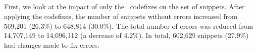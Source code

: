 \documentclass[conference]{IEEEtran}
\begin{document}



\subsection{\rqthree}
\label{sec:rq3}

First, we look at the impact of only the \ts\ codefixes on the set of snippets. After applying the codefixes, the number of snippets without errors increased from 569,201 (26.3\%) to 648,814 (30.0\%). The total number of errors was reduced from 14,707,149 to 14,096,112 (a decrease of 4.2\%). In total, 602,629 snippets (27.9\%) had changes made to fix errors.
\end{document}
